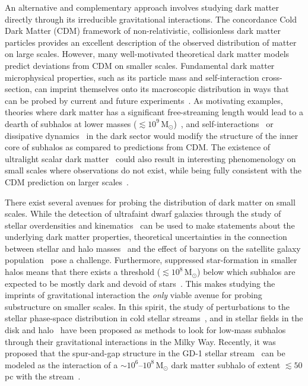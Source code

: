 \documentclass[twocolumn]{aastex63}
\begin{document}
An alternative and complementary approach involves studying dark matter directly through its irreducible gravitational interactions. The concordance Cold Dark Matter (CDM) framework of non-relativistic, collisionless dark matter particles provides an excellent description of the observed distribution of matter on large scales. However, many well-motivated theoretical dark matter models predict deviations from CDM on smaller scales. Fundamental dark matter microphysical properties, such as its particle mass and self-interaction cross-section, can imprint themselves onto its macroscopic distribution in ways that can be probed by current and future experiments~\cite{2019arXiv190201055D}. As motivating examples, theories where dark matter has a significant free-streaming length would lead to a dearth of subhalos at lower masses ($\lesssim 10^9\,\mathrm{M}_\odot$)~\cite{1983ApJ...274..443B,2001ApJ...556...93B,astro-ph/0004381,0807.0622,1008.0992}, and self-interactions~\cite{1508.03339,1311.6524,1211.6426,1208.3026,1201.5892,1805.03203,1904.10539} or dissipative dynamics~\cite{1706.04195,1702.05482,1707.03829,1303.1521,1512.05349} in the dark sector would modify the structure of the inner core of subhalos as compared to predictions from CDM. The existence of ultralight scalar dark matter~\cite{astro-ph/0003365,2017PhRvD..95d3541H} could also result in interesting phenomenology on small scales where observations do not exist, while being fully consistent with the CDM prediction on larger scales~\cite{1705.05845,1608.02575,2019ApJ...871...28B,1705.05845}.

There exist several avenues for probing the distribution of dark matter on small scales. While the detection of ultrafaint dwarf galaxies through the study of stellar overdensities and kinematics~\cite{1503.02584,0706.2687,1503.02079} can be used to make statements about the underlying dark matter properties, theoretical uncertainties in the connection between stellar and halo masses~\cite{1804.03097} and the effect of baryons on the satellite galaxy population~\cite{1812.00044,1811.11791,1701.03792,1608.01849} pose a challenge. Furthermore, suppressed star-formation in smaller halos means that there exists a threshold ($\lesssim 10^8\,\mathrm{M}_\odot$) below which subhalos are expected to be mostly dark and devoid of stars~\cite{1992MNRAS.256P..43E,1611.02281,1607.03127}. This makes studying the imprints of gravitational interaction the \emph{only} viable avenue for probing substructure on smaller scales. In this spirit, the study of perturbations to the stellar phase-space distribution in cold stellar streams~\cite{1804.06854,astro-ph/9807243,1109.6022}, and in stellar fields in the disk and halo~\cite{1711.03554} have been proposed as methods to look for low-mass subhalos through their gravitational interactions in the Milky Way. Recently, it was proposed that the spur-and-gap structure in the GD-1 stellar stream~\cite{1303.4342} can be modeled as the interaction of a $\sim10^{6}$--$10^{8}\,\mathrm M_\odot$ dark matter subhalo of extent $\lesssim 50$\,pc with the stream~\cite{1811.03631}.
\end{document}
